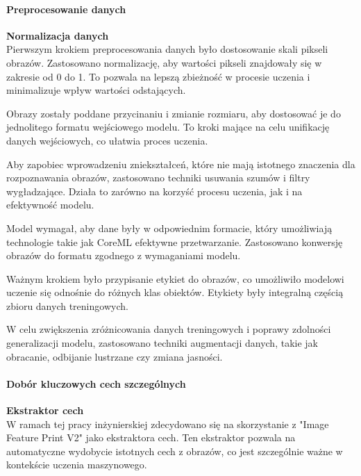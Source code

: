 \documentclass[12pt, a4paper, twoside, openany]{book}
\begin{document}
\paragraph{Preprocesowanie danych\\}
\textbf{Normalizacja danych\\}
Pierwszym krokiem preprocesowania danych było dostosowanie skali pikseli obrazów.
Zastosowano normalizację, aby wartości pikseli znajdowały się w zakresie od 0 do 1.
To pozwala na lepszą zbieżność w procesie uczenia i minimalizuje wpływ wartości odstających.

Obrazy zostały poddane przycinaniu i zmianie rozmiaru, aby dostosować je do jednolitego formatu wejściowego modelu.
To kroki mające na celu unifikację danych wejściowych, co ułatwia proces uczenia.

Aby zapobiec wprowadzeniu zniekształceń, które nie mają istotnego znaczenia dla rozpoznawania obrazów, zastosowano techniki usuwania szumów i filtry wygładzające.
Działa to zarówno na korzyść procesu uczenia, jak i na efektywność modelu.

Model wymagał, aby dane były w odpowiednim formacie, który umożliwiają technologie takie jak CoreML efektywne przetwarzanie.
Zastosowano konwersję obrazów do formatu zgodnego z wymaganiami modelu.

Ważnym krokiem było przypisanie etykiet do obrazów, co umożliwiło modelowi uczenie się odnośnie do różnych klas obiektów.
Etykiety były integralną częścią zbioru danych treningowych.

W celu zwiększenia zróżnicowania danych treningowych i poprawy zdolności generalizacji modelu, zastosowano techniki augmentacji danych, takie jak obracanie, odbijanie lustrzane czy zmiana jasności.

\paragraph{Dobór kluczowych cech szczególnych\\}
\textbf{Ekstraktor cech\\}
W ramach tej pracy inżynierskiej zdecydowano się na skorzystanie z "Image Feature Print V2" jako ekstraktora cech.
Ten ekstraktor pozwala na automatyczne wydobycie istotnych cech z obrazów, co jest szczególnie ważne w kontekście uczenia maszynowego.
\end{document}
